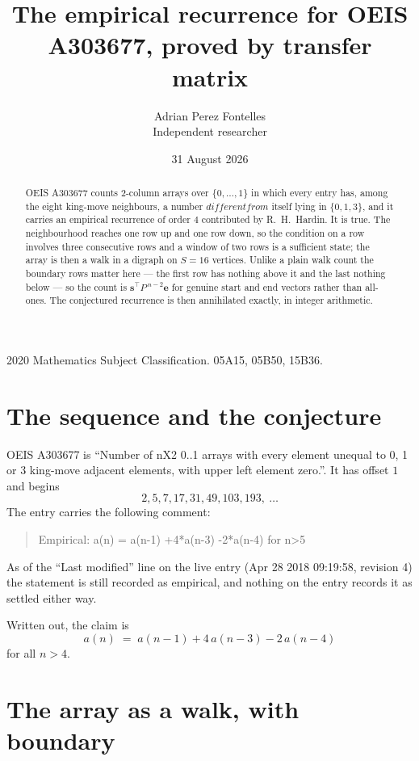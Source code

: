 \documentclass[11pt,a4paper]{article}
\title{The empirical recurrence for OEIS A303677, proved by transfer matrix}
\author{Adrian Perez Fontelles\\ \small Independent researcher}
\date{31 August 2026}
\theoremstyle{plain}
\theoremstyle{definition}
\begin{document}
\maketitle

\begin{abstract}
OEIS A303677 counts $2$-column arrays over $\{0,\dots,1\}$ in which every entry has,
among the eight king-move neighbours, a number $different from$ itself lying in $\{0,1,3\}$, and it carries an empirical
recurrence of order $4$ contributed by R.~H.~Hardin. It is true. The neighbourhood
reaches one row up and one row down, so the condition on a row involves three consecutive
rows and a window of two rows is a sufficient state; the array is then a walk in a digraph
on $S=16$ vertices. Unlike a plain walk count the boundary rows matter here --- the first
row has nothing above it and the last nothing below --- so the count is
$\mathbf{s}^{\!\top}P^{\,n-2}\mathbf{e}$ for genuine start and end vectors rather than
all-ones. The conjectured recurrence is then annihilated exactly, in integer arithmetic.
\end{abstract}

\noindent\small 2020 Mathematics Subject Classification. 05A15, 05B50, 15B36.\normalsize

\section{The sequence and the conjecture}

OEIS A303677 is ``Number of nX2 0..1 arrays with every element unequal to 0, 1 or 3 king-move adjacent elements, with upper left element zero.''. It has offset
$1$ and begins
\[
2, 5, 7, 17, 31, 49, 103, 193,\ \dots
\]
The entry carries the following comment:
\begin{quote}\small
Empirical: a(n) = a(n-1) +4*a(n-3) -2*a(n-4) for n>5
\end{quote}
As of the ``Last modified'' line on the live entry (Apr 28 2018 09:19:58, revision
4) the statement is still recorded as empirical, and nothing on the entry
records it as settled either way.

Written out, the claim is
\begin{equation}\label{eq:conj}
a(n)\;=\;a(n-1) + 4\,a(n-3) - 2\,a(n-4)
\end{equation}
for all $n>4$.

\section{The array as a walk, with boundary}
\end{document}
